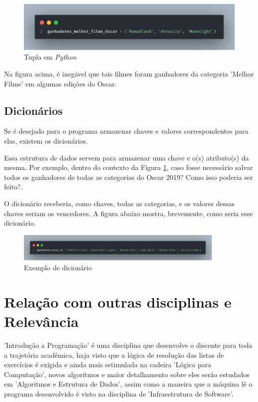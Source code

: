 \documentclass[a4paper, 12pt]{article}
\begin{document}
\begin{figure}[ht]
    \centering
    \includegraphics[width = 13cm]{imagens/tupla.png}
    \caption{Tupla em \textit{Python}}
    \label{tuplas}
\end{figure}
Na figura acima, é inegável que tais filmes foram ganhadores da categoria 'Melhor Filme' em algumas edições do Oscar.

\subsection{Dicionários}

Se é desejado para o programa armazenar chaves e valores correspondentes para elas, existem os dicionários. 

Essa estrutura de dados servem para armazenar uma chave e o(s) atributo(s) da mesma. Por exemplo, dentro do contexto da Figura \ref{tuplas}, caso fosse necessário salvar todos os ganhadores de todas as categorias do Oscar 2019? Como isso poderia ser feito?. 

O dicionário receberia, como chaves, todas as categorias, e os valores dessas chaves seriam os vencedores. A figura abaixo mostra, brevemente, como seria esse dicionário. 

\begin{figure}[ht]
    \centering
    \includegraphics[width = 10cm]{imagens/dicionario.png}
    \caption{Exemplo de dicionário \cite{oscar}}
    \label{Dicionário}
\end{figure}

\section{Relação com outras disciplinas e Relevância}
'Introdução a Programação' é uma disciplina que desenvolve o discente para toda a trajetória acadêmica, haja visto que a lógica de resolução das listas de exercícios é exigida e ainda mais estimulada na cadeira 'Lógica para Computação', novos algoritmos e maior detalhamento sobre eles serão estudados em 'Algoritmos e Estrutura de Dados', assim como a maneira que a máquina lê o programa desenvolvido é visto na disciplina de 'Infraestrutura de Software'. 
\end{document}
